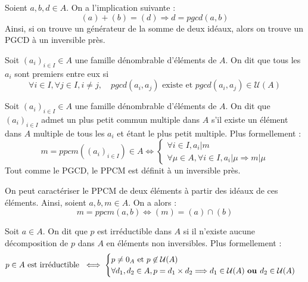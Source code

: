 \begin{proposition}
    Soient $a,b,d \in A$. On a l'implication suivante : 
        \[ (a) + (b) = (d) \Longrightarrow d = pgcd(a,b) \] 
    Ainsi, si on trouve un générateur de la somme de deux idéaux, alors on trouve un PGCD à un inversible près. 
\end{proposition}

\begin{definition}
    Soit $(a_i)_{i \in I} \in A$ une famille dénombrable d'éléments de $A$. 
    On dit que tous les $a_i$ sont premiers entre eux si 
        \[ \forall i \in I, \forall j \in I, i \not  = j, \quad pgcd(a_i, a_j) \text{ existe et } pgcd(a_i, a_j) \in \mathcal{U}(A) \] 
\end{definition}

\begin{definition}[PPCM]
    Soit $(a_i)_{i \in I} \in A$ une famille dénombrable d'éléments de $A$. 
    On dit que $(a_i)_{i \in I}$ admet un plus petit commun multiple dans $A$ s'il existe un élément dans $A$ 
    multiple de tous les $a_i$ et étant le plus petit multiple. 
    Plus formellement : 
        \[ \boxed{ m = ppcm((a_i)_{i \in I}) \in A \iff 
        \begin{cases}
            \forall i \in I, a_i | m \\ 
            \forall \mu \in A, \forall i \in I, a_i | \mu  \Longrightarrow m | \mu 
        \end{cases} } \] 
    Tout comme le PGCD, le PPCM est définit à un inversible près. 
\end{definition}

\begin{proposition}
    On peut caractériser le PPCM de deux éléments à partir des idéaux de ces éléments. 
    Ainsi, soient $a,b, m \in A$. On a alors : 
        \[ \boxed{ m = ppcm(a,b) \iff (m) = (a) \cap (b) } \] 
\end{proposition}

\newpage

\begin{definition}
    Soit $a \in A$. On dit que $p$ est irréductible dans $A$ si il n'existe aucune décomposition de $p$ dans 
    $A$ en éléments non inversibles. Plus formellement : 
        \[ p \in A \text{ est irréductible } \iff 
        \begin{cases}
            p \not = 0_A \text{ et } p \not \in \mathcal{U}(A) \\ 
            \forall d_1, d_2 \in A,  p = d_1 \times d_2 \Longrightarrow d_1 \in \mathcal{U}(A) \text{ \textbf{ou }} d_2 \in \mathcal{U}(A) 
        \end{cases} \] 
\end{definition}



